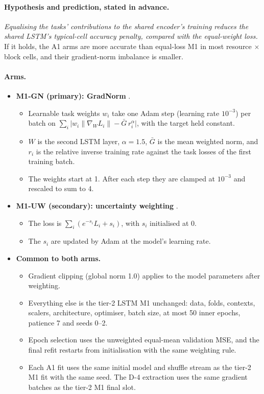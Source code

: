 \documentclass[a4paper,11pt]{article}
\begin{document}
\paragraph{Hypothesis and prediction, stated in advance.} \emph{Equalising the tasks' contributions to the
shared encoder's training reduces the shared LSTM's typical-cell accuracy penalty, compared with the
equal-weight loss.} If it holds, the A1 arms are more accurate than equal-loss M1 in most resource $\times$
block cells, and their gradient-norm imbalance is smaller.

\paragraph{Arms.}
\begin{itemize}
\item \textbf{M1-GN (primary): GradNorm} \citep{Chen2018GradNorm}.
  \begin{itemize}
  \item Learnable task weights $w_i$ take one Adam step (learning rate $10^{-3}$) per batch on
    $\sum_i \lvert w_i\lVert\nabla_W L_i\rVert - \bar G\, r_i^{\alpha}\rvert$, with the target held constant.
  \item $W$ is the second LSTM layer, $\alpha=1.5$, $\bar G$ is the mean weighted norm, and $r_i$ is the relative
    inverse training rate against the task losses of the first training batch.
  \item The weights start at 1. After each step they are clamped at $10^{-3}$ and rescaled to sum to 4.
  \end{itemize}
\item \textbf{M1-UW (secondary): uncertainty weighting} \citep{Kendall2018Uncertainty}.
  \begin{itemize}
  \item The loss is $\sum_i (e^{-s_i}L_i+s_i)$, with $s_i$ initialised at 0.
  \item The $s_i$ are updated by Adam at the model's learning rate.
  \end{itemize}
\item \textbf{Common to both arms.}
  \begin{itemize}
  \item Gradient clipping (global norm 1.0) applies to the model parameters after weighting.
  \item Everything else is the tier-2 LSTM M1 unchanged: data, folds, contexts, scalers, architecture,
    optimiser, batch size, at most 50 inner epochs, patience 7 and seeds 0--2.
  \item Epoch selection uses the unweighted equal-mean validation MSE, and the final refit restarts from
    initialisation with the same weighting rule.
  \item Each A1 fit uses the same initial model and shuffle stream as the tier-2 M1 fit with the same seed. The D-4
    extraction uses the same gradient batches as the tier-2 M1 final slot.
  \end{itemize}
\end{itemize}
\end{document}
